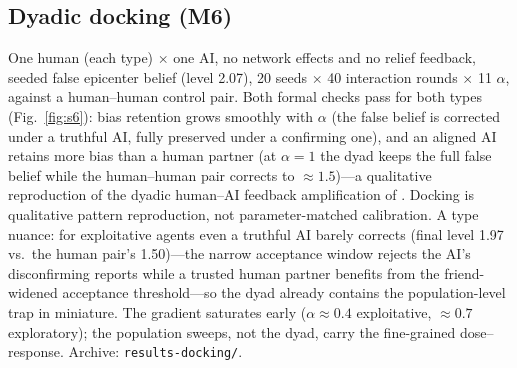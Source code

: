 \documentclass[11pt]{article}
\begin{document}
\subsection{Dyadic docking (M6)}
One human (each type) $\times$ one AI, no network effects and no relief
feedback, seeded false epicenter belief (level 2.07), 20 seeds $\times$
40 interaction rounds $\times$ 11 $\alpha$, against a human--human
control pair. Both formal checks pass for both types
(Fig.~\ref{fig:s6}): bias retention grows smoothly with $\alpha$ (the
false belief is corrected under a truthful AI, fully preserved under a
confirming one), and an aligned AI retains more bias than a human partner
(at $\alpha = 1$ the dyad keeps the full false belief while the
human--human pair corrects to $\approx 1.5$)---a qualitative reproduction
of the dyadic human--AI feedback amplification of
\citet{glickman2024human}. Docking is qualitative pattern reproduction,
not parameter-matched calibration. A type nuance: for exploitative
agents even a truthful AI barely corrects (final level 1.97 vs.\ the
human pair's 1.50)---the narrow acceptance window rejects the AI's
disconfirming reports while a trusted human partner benefits from the
friend-widened acceptance threshold---so the dyad already contains the
population-level trap in miniature. The gradient saturates early
($\alpha \approx 0.4$ exploitative, $\approx 0.7$ exploratory); the
population sweeps, not the dyad, carry the fine-grained dose--response.
Archive: \texttt{results-docking/}.
\end{document}
